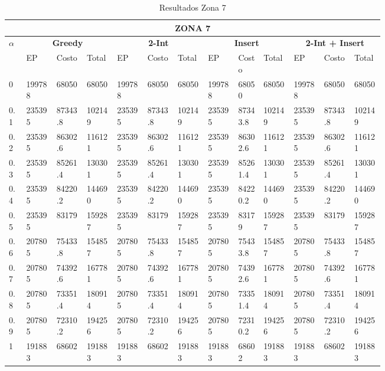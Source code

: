 \documentclass[conference]{IEEEtran}
\begin{document}
\begin{table*}[t]
\caption{Resultados Zona 7}
\centering
\begin{tabular}{|p{0.03\linewidth}|p{0.06\linewidth}|p{0.06\linewidth}|p{0.06\linewidth}|p{0.06\linewidth}|p{0.06\linewidth}|p{0.06\linewidth}|p{0.06\linewidth}|p{0.05\linewidth}|p{0.06\linewidth}|p{0.06\linewidth}|p{0.06\linewidth}|p{0.06\linewidth}|}
\hline
\multicolumn{13}{|c|}{\textbf{ZONA 7}} \\ 
\hline

\multirow{2}{*}{\textbf{$\alpha$}}  & \multicolumn{3}{|c|}{\textbf{Greedy}} & \multicolumn{3}{|c|}{\textbf{2-Int}} & \multicolumn{3}{|c|}{\textbf{Insert}} & \multicolumn{3}{|c|}{\textbf{2-Int + Insert}} \\

\cline{2-13}
 & EP & Costo & Total & EP & Costo & Total & EP & Costo & Total & EP & Costo & Total  \\
\hline
0 & 199788 & 68050 & 68050 & 199788 & 68050 & 68050 & 199788 & 68050 & 68050 & 199788 & 68050 & 68050  \\
\hline

0.1 & 235395 & 87343.8 & 102149 & 235395 & 87343.8 & 102149 & 235395 & 87343.8 & 102149 & 235395 & 87343.8 & 102149  \\
\hline

0.2 & 235395 & 86302.6 & 116121 & 235395 & 86302.6 & 116121 & 235395 & 86302.6 & 116121 & 235395 & 86302.6 & 116121  \\
\hline

0.3 & 235395 & 85261.4 & 130301 & 235395 & 85261.4 & 130301 & 235395 & 85261.4 & 130301 & 235395 & 85261.4 & 130301  \\
\hline

0.4 & 235395 & 84220.2 & 144690 & 235395 & 84220.2 & 144690 & 235395 & 84220.2 & 144690 & 235395 & 84220.2 & 144690  \\
\hline

0.5 & 235395 & 83179 & 159287 & 235395 & 83179 & 159287 & 235395 & 83179 & 159287 & 235395 & 83179 & 159287  \\
\hline

0.6 & 207805 & 75433.8 & 154857 & 207805 & 75433.8 & 154857 & 207805 & 75433.8 & 154857 & 207805 & 75433.8 & 154857  \\
\hline

0.7 & 207805 & 74392.6 & 167781 & 207805 & 74392.6 & 167781 & 207805 & 74392.6 & 167781 & 207805 & 74392.6 & 167781  \\
\hline

0.8 & 207805 & 73351.4 & 180914 & 207805 & 73351.4 & 180914 & 207805 & 73351.4 & 180914 & 207805 & 73351.4 & 180914  \\
\hline

0.9 & 207805 & 72310.2 & 194256 & 207805 & 72310.2 & 194256 & 207805 & 72310.2 & 194256 & 207805 & 72310.2 & 194256  \\
\hline

1 & 191883 & 68602 & 191883 & 191883 & 68602 & 191883 & 191883 & 68602 & 191883 & 191883 & 68602 & 191883  \\
\hline


\end{tabular}
\end{table*}
\end{document}
